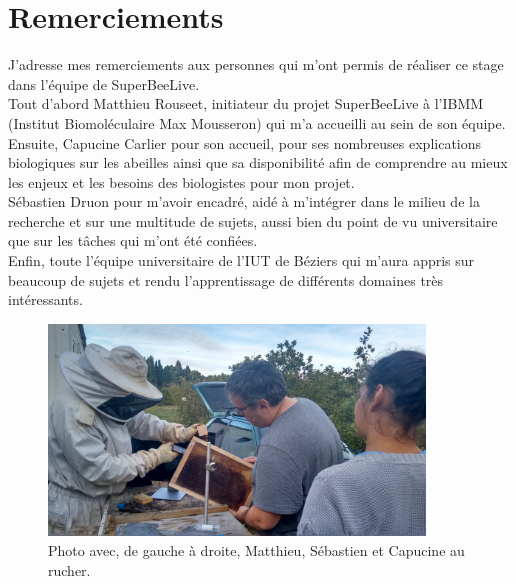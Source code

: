 \documentclass[11pt,french,a4paper]{report}
\begin{document}
\clearpage
\newpage 

\tableofcontents

\chapter*{Remerciements}

J’adresse mes remerciements aux personnes qui m’ont permis de réaliser ce stage dans l’équipe de SuperBeeLive. \\
Tout d’abord Matthieu Rouseet, initiateur du projet SuperBeeLive à l'IBMM (Institut Biomoléculaire Max Mousseron) 
qui m’a accueilli au sein de son équipe. \\

Ensuite, Capucine Carlier pour son accueil, pour ses nombreuses explications biologiques sur les abeilles ainsi que sa disponibilité 
afin de comprendre au mieux les enjeux et les besoins des biologistes pour mon projet. \\

Sébastien Druon pour m’avoir encadré, aidé à m’intégrer dans le milieu de la recherche et sur une multitude 
de sujets, aussi bien du point de vu universitaire que sur les tâches qui m’ont été confiées. \\

Enfin, toute l'équipe universitaire de l'IUT de Béziers qui m'aura appris sur beaucoup de sujets et rendu l'apprentissage
de différents domaines très intéressants. 

\begin{figure}[!h]
\centering
\includegraphics[width=10cm]{../images/photo/IMG_20171110_154804205_HDR.jpg}
\caption{Photo avec, de gauche à droite, Matthieu, Sébastien et Capucine au rucher.}
\label{ruche_pers}
\end{figure}



\tableofcontent

\clearpage
\end{document}
